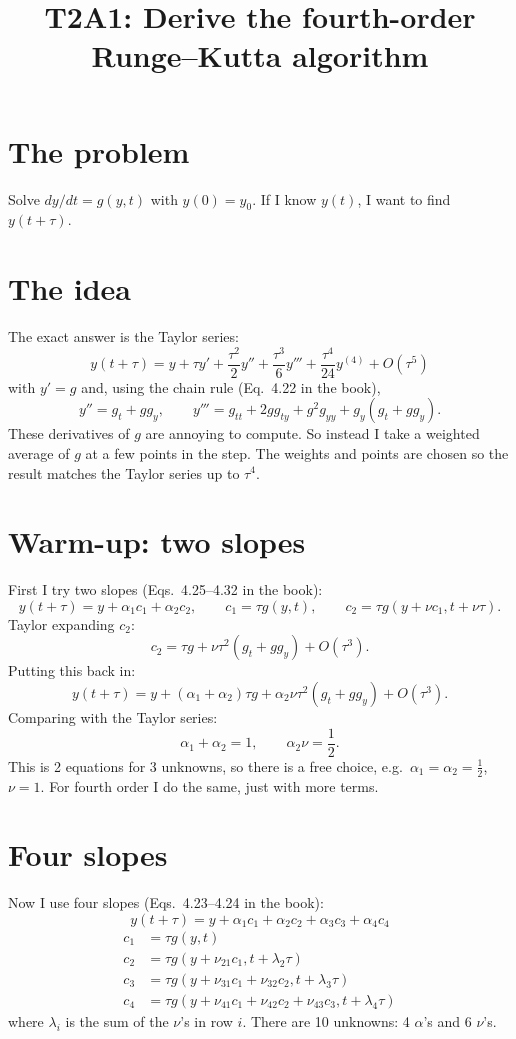 \documentclass[11pt]{article}
\title{T2A1: Derive the fourth-order Runge--Kutta algorithm}
\date{}
\begin{document}
\maketitle

\section*{The problem}
Solve $dy/dt = g(y,t)$ with $y(0)=y_0$. If I know $y(t)$, I want to find $y(t+\tau)$.

\section*{The idea}
The exact answer is the Taylor series:
\[
y(t+\tau) = y + \tau y' + \frac{\tau^2}{2}y'' + \frac{\tau^3}{6}y''' + \frac{\tau^4}{24}y^{(4)} + O(\tau^5)
\]
with $y' = g$ and, using the chain rule (Eq.~4.22 in the book),
\[
y'' = g_t + g g_y, \qquad y''' = g_{tt} + 2g g_{ty} + g^2 g_{yy} + g_y(g_t + g g_y).
\]
These derivatives of $g$ are annoying to compute. So instead I take a weighted average of $g$ at a few points in the step. The weights and points are chosen so the result matches the Taylor series up to $\tau^4$.

\section*{Warm-up: two slopes}
First I try two slopes (Eqs.~4.25--4.32 in the book):
\[
y(t+\tau) = y + \alpha_1 c_1 + \alpha_2 c_2, \qquad c_1 = \tau g(y,t), \qquad c_2 = \tau g(y+\nu c_1, t+\nu\tau).
\]
Taylor expanding $c_2$:
\[
c_2 = \tau g + \nu\tau^2 (g_t + g g_y) + O(\tau^3).
\]
Putting this back in:
\[
y(t+\tau) = y + (\alpha_1+\alpha_2)\tau g + \alpha_2\nu\tau^2(g_t + g g_y) + O(\tau^3).
\]
Comparing with the Taylor series:
\[
\alpha_1 + \alpha_2 = 1, \qquad \alpha_2\nu = \frac12.
\]
This is 2 equations for 3 unknowns, so there is a free choice, e.g.\ $\alpha_1=\alpha_2=\frac12$, $\nu=1$.
For fourth order I do the same, just with more terms.

\section*{Four slopes}
Now I use four slopes (Eqs.~4.23--4.24 in the book):
\[
y(t+\tau) = y + \alpha_1 c_1 + \alpha_2 c_2 + \alpha_3 c_3 + \alpha_4 c_4
\]
\begin{align*}
c_1 &= \tau g(y, t) \\
c_2 &= \tau g(y+\nu_{21}c_1, t+\lambda_2\tau) \\
c_3 &= \tau g(y+\nu_{31}c_1+\nu_{32}c_2, t+\lambda_3\tau) \\
c_4 &= \tau g(y+\nu_{41}c_1+\nu_{42}c_2+\nu_{43}c_3, t+\lambda_4\tau)
\end{align*}
where $\lambda_i$ is the sum of the $\nu$'s in row $i$. There are 10 unknowns: 4 $\alpha$'s and 6 $\nu$'s.
\end{document}
